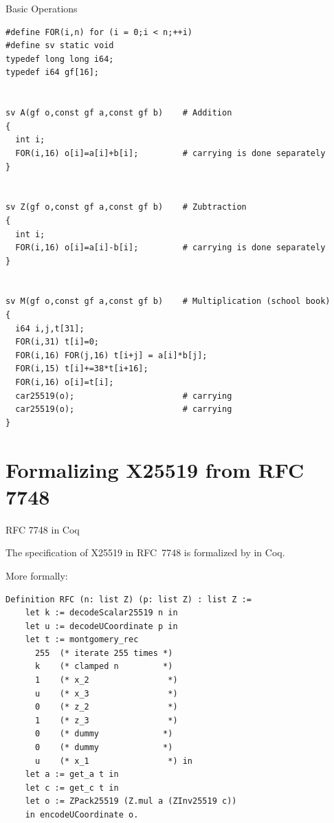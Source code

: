 \documentclass[8pt,aspectratio=169]{beamer}
\begin{document}
%
%
\begin{frame}[fragile]{Basic Operations}
  \begin{center}

\begin{lstlisting}[language=Ctweetnacl]
#define FOR(i,n) for (i = 0;i < n;++i)
#define sv static void
typedef long long i64;
typedef i64 gf[16];


sv A(gf o,const gf a,const gf b)    # Addition
{
  int i;
  FOR(i,16) o[i]=a[i]+b[i];         # carrying is done separately
}


sv Z(gf o,const gf a,const gf b)    # Zubtraction
{
  int i;
  FOR(i,16) o[i]=a[i]-b[i];         # carrying is done separately
}


sv M(gf o,const gf a,const gf b)    # Multiplication (school book)
{
  i64 i,j,t[31];
  FOR(i,31) t[i]=0;
  FOR(i,16) FOR(j,16) t[i+j] = a[i]*b[j];
  FOR(i,15) t[i]+=38*t[i+16];
  FOR(i,16) o[i]=t[i];
  car25519(o);                      # carrying
  car25519(o);                      # carrying
}
\end{lstlisting}

  \end{center}
\end{frame}


\section{Formalizing X25519 from RFC 7748}

%
%
\begin{frame}[fragile]{RFC 7748 in Coq}
  \begin{informaltheorem}
  The specification of X25519 in RFC~7748 is formalized by  in Coq.
  \end{informaltheorem}

  More formally:
  \begin{center}
  \begin{lstlisting}[language=Coq]
  Definition RFC (n: list Z) (p: list Z) : list Z :=
    let k := decodeScalar25519 n in
    let u := decodeUCoordinate p in
    let t := montgomery_rec
      255  (* iterate 255 times *)
      k    (* clamped n         *)
      1    (* x_2                *)
      u    (* x_3                *)
      0    (* z_2                *)
      1    (* z_3                *)
      0    (* dummy             *)
      0    (* dummy             *)
      u    (* x_1                *) in
    let a := get_a t in
    let c := get_c t in
    let o := ZPack25519 (Z.mul a (ZInv25519 c))
    in encodeUCoordinate o.
  \end{lstlisting}
  \end{center}
\end{frame}
\end{document}
